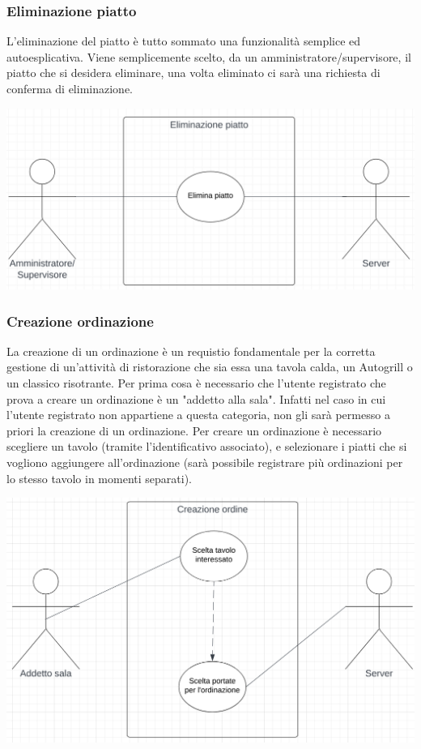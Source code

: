 \subsubsection{Eliminazione piatto}
L'eliminazione del piatto è tutto sommato una funzionalità semplice ed autoesplicativa. Viene semplicemente scelto, da un amministratore/supervisore, il piatto che si desidera eliminare, una volta eliminato ci sarà una richiesta di conferma di eliminazione.
\begin{center}
  \includegraphics[scale=0.5]{img/use_case/use_case-eliminazione_piatto.png}
\end{center}
\newpage
\subsubsection{Creazione ordinazione}
La creazione di un ordinazione è un requistio fondamentale per la corretta gestione di un'attività di ristorazione che sia essa una tavola calda, un Autogrill o un classico risotrante. Per prima cosa è necessario che l'utente registrato che prova a creare un ordinazione è un "addetto alla sala". Infatti nel caso in cui l'utente registrato non appartiene a questa categoria, non gli sarà permesso a priori la creazione di un ordinazione. Per creare un ordinazione è necessario scegliere un tavolo (tramite l'identificativo associato), e selezionare i piatti che si vogliono aggiungere all'ordinazione (sarà possibile registrare più ordinazioni per lo stesso tavolo in momenti separati).
\begin{center}
  \includegraphics[scale=0.6]{img/use_case/use_case-creazione_ordine.png}
\end{center}
\newpage
